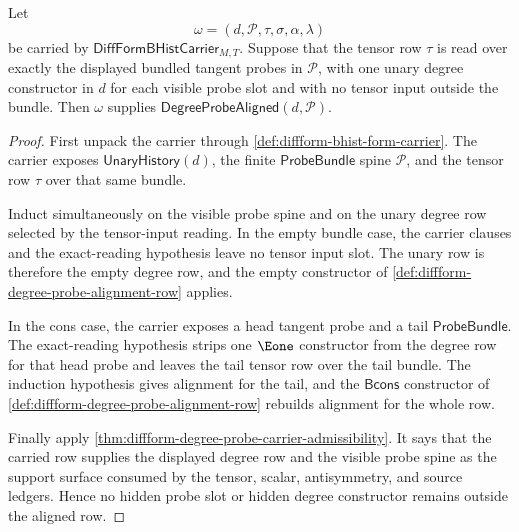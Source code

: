 \begin{theorem}
\label{thm:diffform-degree-probe-alignment-carrier-refinement}
Let
$$
\omega=(d,\mathcal{P},\tau,\sigma,\alpha,\lambda)
$$
be carried by $\mathsf{DiffFormBHistCarrier}_{M,T}$. Suppose that the tensor
row $\tau$ is read over exactly the displayed bundled tangent probes in
$\mathcal{P}$, with one unary degree constructor in $d$ for each visible probe
slot and with no tensor input outside the bundle. Then $\omega$ supplies
$\mathsf{DegreeProbeAligned}(d,\mathcal{P})$.
\end{theorem}
\begin{proof}
First unpack the carrier through
\autoref{def:diffform-bhist-form-carrier}. The carrier exposes
$\mathsf{UnaryHistory}(d)$, the finite $\mathsf{ProbeBundle}$ spine
$\mathcal{P}$, and the tensor row $\tau$ over that same bundle.

Induct simultaneously on the visible probe spine and on the unary degree row
selected by the tensor-input reading. In the empty bundle case, the carrier
clauses and the exact-reading hypothesis leave no tensor input slot. The
unary row is therefore the empty degree row, and the empty constructor of
\autoref{def:diffform-degree-probe-alignment-row} applies.

In the cons case, the carrier exposes a head tangent probe and a tail
$\mathsf{ProbeBundle}$. The exact-reading hypothesis strips one $\Eone$
constructor from the degree row for that head probe and leaves the tail tensor
row over the tail bundle. The induction hypothesis gives alignment for the
tail, and the $\mathsf{Bcons}$ constructor of
\autoref{def:diffform-degree-probe-alignment-row} rebuilds alignment for the
whole row.

Finally apply
\autoref{thm:diffform-degree-probe-carrier-admissibility}. It says that the
carried row supplies the displayed degree row and the visible probe spine as
the support surface consumed by the tensor, scalar, antisymmetry, and source
ledgers. Hence no hidden probe slot or hidden degree constructor remains
outside the aligned row.
\end{proof}


